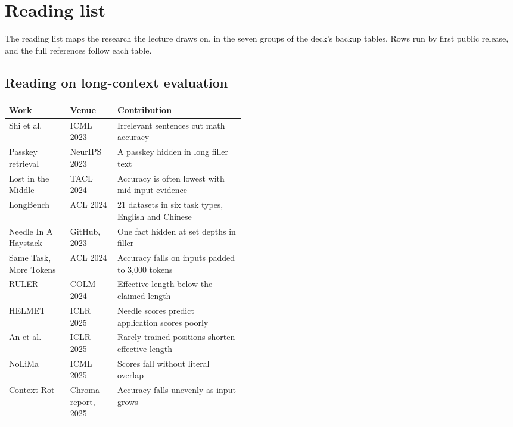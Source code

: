\section{Reading list}
\label{sec:reading}

The reading list maps the research the lecture draws on, in the seven groups of the deck's backup tables. Rows run by first public release, and the full references follow each table.

\subsection{Reading on long-context evaluation}
\label{sec:it-R-eval}

\begin{center}\footnotesize
\begin{tabularx}{\linewidth}{L{0.26\linewidth}L{0.2\linewidth}X}
\toprule
\textbf{Work} & \textbf{Venue} & \textbf{Contribution} \\
\midrule
Shi et al. & ICML 2023 & Irrelevant sentences cut math accuracy \\
Passkey retrieval & NeurIPS 2023 & A passkey hidden in long filler text \\
Lost in the Middle & TACL 2024 & Accuracy is often lowest with mid-input evidence \\
LongBench & ACL 2024 & 21 datasets in six task types, English and Chinese \\
Needle In A Haystack & GitHub, 2023 & One fact hidden at set depths in filler \\
Same Task, More Tokens & ACL 2024 & Accuracy falls on inputs padded to 3,000 tokens \\
RULER & COLM 2024 & Effective length below the claimed length \\
HELMET & ICLR 2025 & Needle scores predict application scores poorly \\
An et al. & ICLR 2025 & Rarely trained positions shorten effective length \\
NoLiMa & ICML 2025 & Scores fall without literal overlap \\
Context Rot & Chroma report, 2025 & Accuracy falls unevenly as input grows \\
\bottomrule
\end{tabularx}
\end{center}

